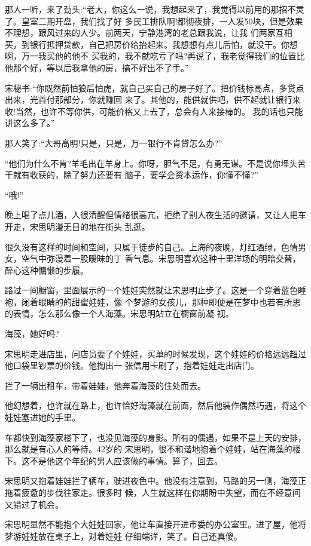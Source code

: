 \documentclass[11pt,a4paper,onecolumn]{article}
\begin{document}
那人一听，来了劲头:``老大，你这么一说，我想起来了，我觉得以前用的那招不灵了。皇室二期开盘，我们找了好
多民工排队啊!都彻夜排，一人发50块，但是效果不理想，跟风过来的人少。前两天，宁静港湾的老总跟我说，让我
们两家互相买，到银行抵押贷款，自己把房价给抬起来。我想想有点儿后怕，就没干。你想啊，万一我买他的他不
买我的，我不就吃亏了吗?再说了，我老觉得我们的位置比他那个好，等以后我拿他的房，搞不好出不了手。''

宋秘书:``你既然前怕狼后怕虎，就自己买自己的房子好了。把价钱标高点，多贷点出来，光首付那部分，你就赚回
来了。其他的，能供就供吧，供不起就让银行来收!当然，也许不等你供，可能价格又上去了，总会有人来接棒的。
我的话也只能讲这么多了。''

那人笑了:``大哥高明!只是，只是，万一银行不肯贷怎么办?''

``他们为什么不肯?羊毛出在羊身上。你呀，胆气不足，有勇无谋。不是说你埋头苦干就有收获的，除了努力还要有
脑子，要学会资本运作，你懂不懂?''

``哦!''

晚上喝了点儿酒，人很清醒但情绪很高亢，拒绝了别人夜生活的邀请，又让人把车开走，宋思明漫无目的地在街头
乱逛。

很久没有这样的时间和空间，只属于徒步的自己。上海的夜晚，灯红酒绿，色情男女，空气中弥漫着一股暧昧的丁
香气息。宋思明喜欢这种十里洋场的明暗交替，醉心这种慵懒的步履。

路过一间橱窗，里面展示的一个娃娃突然就让宋思明止步了。这是一个穿着蓝色睡袍，闭着眼睛的的甜蜜娃娃，像
个梦游的女孩儿，那种即便是在梦中也若有所思的表情，怎么那么像一个人\myrule 海藻。宋思明站立在橱窗前凝
视。

海藻，她好吗?

宋思明走进店里，问店员要了个娃娃，买单的时候发现，这个娃娃的价格远远超过他口袋里钞票的价钱。他掏出一
张信用卡刷了，抱着娃娃走出店门。

拦了一辆出租车，带着娃娃，他奔着海藻的住处而去。

他幻想着，也许就在路上，也许恰好海藻就在前面，然后他装作偶然巧遇，将这个娃娃塞进她的手里。

车都快到海藻家楼下了，也没见海藻的身影。所有的偶遇，如果不是上天的安排，那么就是有心人的等待。42岁的
宋思明，很不和谐地抱着个娃娃，站在海藻的楼下。这不是他这个年纪的男人应该做的事情。算了，回去。

宋思明又抱着娃娃拦了辆车，驶进夜色中。他没有注意到，马路的另一侧，海藻正拖着疲惫的步伐往家走。很多时
候，人生就这样在你期盼中失望，而在不经意间又错过了机会。

宋思明显然不能抱个大娃娃回家，他让车直接开进市委的办公室里。进了屋，他将梦游娃娃放在桌子上，对着娃娃
仔细端详，笑了。自己还真傻。
\end{document}
